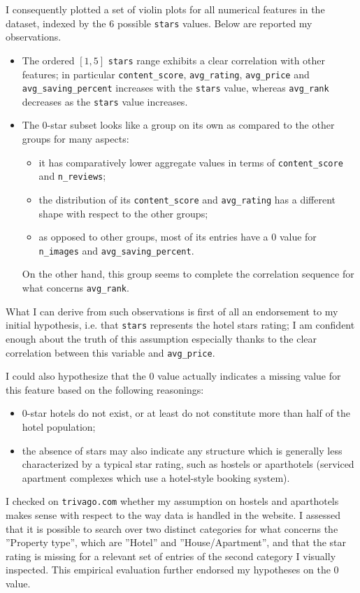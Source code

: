\documentclass[preprint,12pt,3p]{elsarticle}
\begin{document}
I consequently plotted a set of violin plots for all numerical features in the dataset, indexed by the $6$ possible \verb|stars| values. Below are reported my observations.
\begin{itemize}
	\item The ordered $[1,5]$ \verb|stars| range exhibits a clear correlation with other features; in particular \verb|content_score|, \verb|avg_rating|, \verb|avg_price| and \verb|avg_saving_percent| increases with the \verb|stars| value, whereas \verb|avg_rank| decreases as the \verb|stars| value increases.
	\item The $0$-star subset looks like a group on its own as compared to the other groups for many aspects:
	\begin{itemize}
		\item it has comparatively lower aggregate values in terms of \verb|content_score| and \verb|n_reviews|;
		\item the distribution of its \verb|content_score| and \verb|avg_rating| has a different shape with respect to the other groups;
		\item as opposed to other groups, most of its entries have a $0$ value for \verb|n_images| and \verb|avg_saving_percent|.
	\end{itemize}
	On the other hand, this group seems to complete the correlation sequence for what concerns \verb|avg_rank|.
\end{itemize}

What I can derive from such observations is first of all an endorsement to my initial hypothesis, i.e. that \verb|stars| represents the hotel stars rating; I am confident enough about the truth of this assumption especially thanks to the clear correlation between this variable and \verb|avg_price|.

I could also hypothesize that the $0$ value actually indicates a missing value for this feature based on the following reasonings:
\begin{itemize}
	\item 0-star hotels do not exist, or at least do not constitute more than half of the hotel population;
	\item the absence of stars may also indicate any structure which is generally less characterized by a typical star rating, such as hostels or aparthotels (serviced apartment complexes which use a hotel-style booking system).
\end{itemize}

I checked on \verb|trivago.com| whether my assumption on hostels and aparthotels makes sense with respect to the way data is handled in the website. I assessed that it is possible to search over two distinct categories for what concerns the ''Property type'', which are ''Hotel'' and ''House/Apartment'', and that the star rating is missing for a relevant set of entries of the second category I visually inspected. This empirical evaluation further endorsed my hypotheses on the $0$ value.
\end{document}
